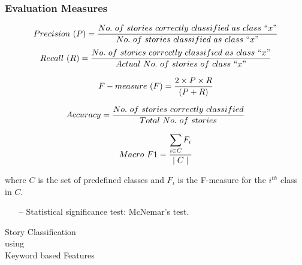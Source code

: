 \documentclass{beamer}
\begin{document}
\begin{frame} \label{Evaluation Measures}
\frametitle{Evaluation Measures}

\begin{equation*}
\title{Precision}
Precision\ (P) = \frac{No.\ of\ stories\ correctly\ classified\ as\ class\ ``x"}{No.\ of\ stories\ classified\ as\ class\ ``x"} 
\end{equation*}
\begin{equation*}
\title{Recall}
Recall\ (R) = \frac{No.\ of\ stories\ correctly\ classified\ as\ class\ ``x"}{Actual\ No.\ of\ stories\ of\ class\ ``x"} 
\end{equation*}

\begin{equation*}
\title{F-Measure}
F-measure\ (F) = \frac{2\times P\times R}{(P +R)} 
\end{equation*}

\begin{equation*}
\title{Accuracy}
Accuracy = \frac{No.\ of\ stories\ correctly\ classified}{Total\ No.\ of\ stories}
\end{equation*}


\begin{equation*}
\title{Accuracy}
Macro\ F1 = \frac{\displaystyle\sum_{i \in C} F_i}{\mid C \mid}
\end{equation*}

where $C$ is the set of predefined classes and $F_i$ is the F-measure for the $i^{th}$ class in $C$.  
\begin{itemize}
\item[--] Statistical significance test: McNemar's test. \hyperlink{McNemar's significance test}{\beamergotobutton{}}
\end{itemize}
\end{frame}



\begin{frame}
\begin{center}
\Huge{Story Classification\\ using\\ Keyword based Features}
\end{center}
\end{frame}
\end{document}
